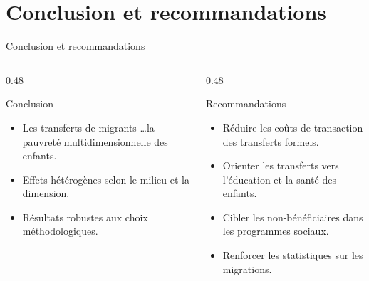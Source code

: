 \documentclass[10pt,aspectratio=169]{beamer}
\begin{document}
\section[Conclusion]{Conclusion et recommandations}

\begin{frame}{Conclusion et recommandations}
  \begin{columns}[T]
    \begin{column}{0.48\textwidth}
      \begin{block}{Conclusion}
        \begin{itemize}
          \item Les transferts de migrants \dots la pauvreté multidimensionnelle des enfants.
          \item Effets hétérogènes selon le milieu et la dimension.
          \item Résultats robustes aux choix méthodologiques.
        \end{itemize}
      \end{block}
    \end{column}
    \begin{column}{0.48\textwidth}
      \begin{block}{Recommandations}
        \begin{itemize}
          \item Réduire les coûts de transaction des transferts formels.
          \item Orienter les transferts vers l'éducation et la santé des enfants.
          \item Cibler les non-bénéficiaires dans les programmes sociaux.
          \item Renforcer les statistiques sur les migrations.
        \end{itemize}
      \end{block}
    \end{column}
  \end{columns}
\end{frame}
\end{document}
